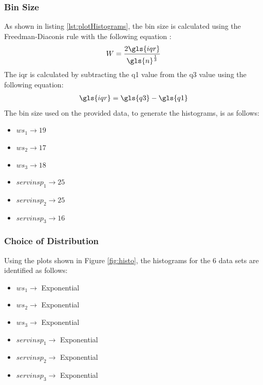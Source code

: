 \documentclass[final, hidelinks, 12pt, a4paper]{article}
\begin{document}
    \subsubsection{Bin Size}
    \label{sssct:binSize}
    As shown in listing \ref{lst:plotHistograms}, the bin size is calculated using the Freedman-Diaconis rule with the following equation \cite{acc:binSize}:
    \begin{align}
        W = \frac{2 \gls{iqr}}{\gls{n}^{\frac{1}{3}}}
        \label{eqt:binWidth}
    \end{align}
    The \gls{iqr} is calculated by subtracting the \gls{q1} value from the \gls{q3} value using the following equation:
    \begin{align}
        \gls{iqr} = \gls{q3} - \gls{q1}
        \label{eqt:iqrMath}
    \end{align}
    The bin size used on the provided data, to generate the histograms, is as follows:
    \begin{itemize}
        \item $ws_1 \rightarrow 19$
        \item $ws_2 \rightarrow 17$
        \item $ws_3 \rightarrow 18$
        \item $servinsp_1 \rightarrow 25$
        \item $servinsp_2 \rightarrow 25$
        \item $servinsp_3 \rightarrow 16$
    \end{itemize}


    \subsubsection{Choice of Distribution}
    \label{sssct:choiceDistribution}
    Using the plots shown in Figure \ref{fig:histo}, the histograms for the 6 data sets are identified as follows:
    \begin{itemize}
        \item $ws_1 \rightarrow$ Exponential
        \item $ws_2 \rightarrow$ Exponential
        \item $ws_3 \rightarrow$ Exponential
        \item $servinsp_1 \rightarrow$ Exponential
        \item $servinsp_2 \rightarrow$ Exponential
        \item $servinsp_3 \rightarrow$ Exponential
    \end{itemize}
\end{document}
